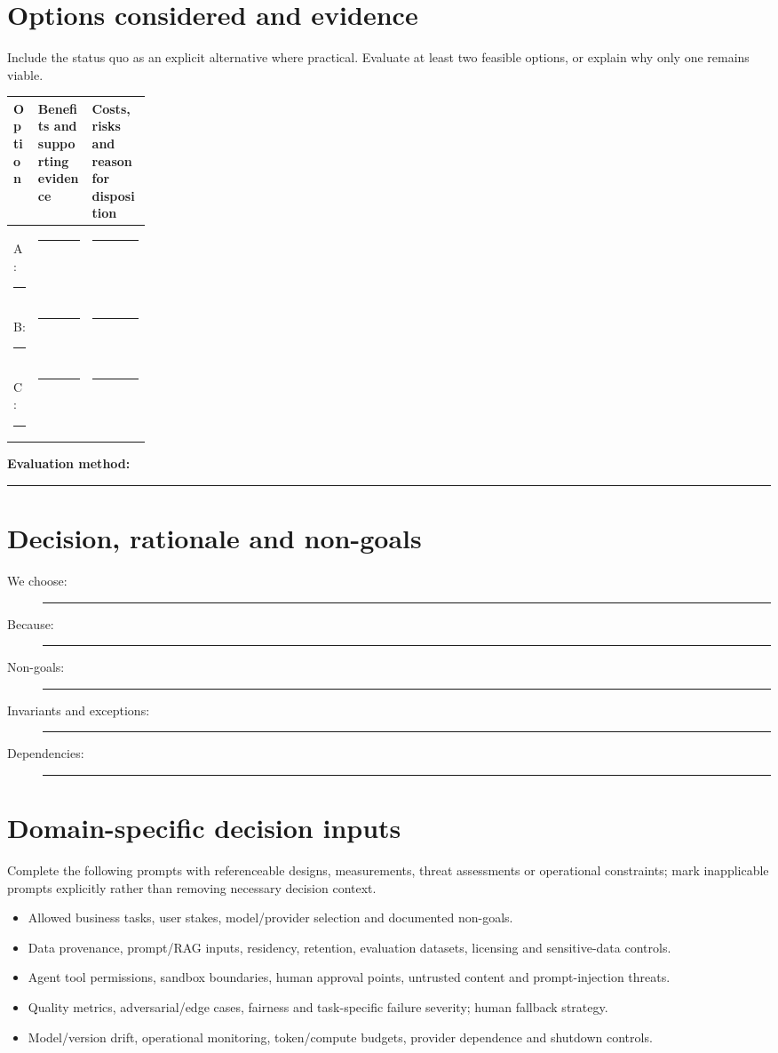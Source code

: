 \documentclass[11pt,letterpaper]{article}
\newcommand{\BlankResponse}{\rule[-0.4em]{0pt}{2em}\rule{0.65\linewidth}{0.4pt}}
\begin{document}
\section{Options considered and evidence}
Include the status quo as an explicit alternative where practical. Evaluate
at least two feasible options, or explain why only one remains viable.
\par\noindent\begin{tabularx}{\linewidth}{@{}>{\raggedright\arraybackslash}p{0.18\linewidth}>{\raggedright\arraybackslash}X >{\raggedright\arraybackslash}X@{}}
\toprule
\textbf{Option} & \textbf{Benefits and supporting evidence} & \textbf{Costs, risks and reason for disposition}\\
\midrule
A: \BlankResponse & \BlankResponse & \BlankResponse\\
B: \BlankResponse & \BlankResponse & \BlankResponse\\
C: \BlankResponse & \BlankResponse & \BlankResponse\\
\bottomrule
\end{tabularx}\par

\noindent\textbf{Evaluation method:} \BlankResponse

\section{Decision, rationale and non-goals}
\begin{description}
\item[We choose:] \BlankResponse
\item[Because:] \BlankResponse
\item[Non-goals:] \BlankResponse
\item[Invariants and exceptions:] \BlankResponse
\item[Dependencies:] \BlankResponse
\end{description}

\section{Domain-specific decision inputs}
Complete the following prompts with referenceable designs, measurements,
threat assessments or operational constraints; mark inapplicable prompts
explicitly rather than removing necessary decision context.
\begin{itemize}
\item Allowed business tasks, user stakes, model/provider selection and documented non-goals.
\item Data provenance, prompt/RAG inputs, residency, retention, evaluation datasets, licensing and sensitive-data controls.
\item Agent tool permissions, sandbox boundaries, human approval points, untrusted content and prompt-injection threats.
\item Quality metrics, adversarial/edge cases, fairness and task-specific failure severity; human fallback strategy.
\item Model/version drift, operational monitoring, token/compute budgets, provider dependence and shutdown controls.
\end{itemize}
\end{document}
